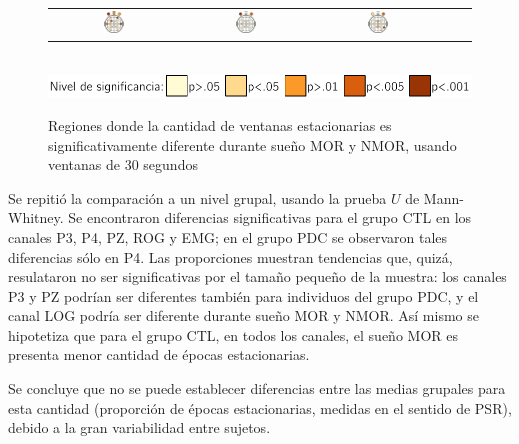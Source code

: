 \begin{figure}
\begin{tabular}{ccccc}
\includegraphics[width=0.17\textwidth]{./img_art_dfa/cabeza_new_RRU_30.pdf} &
\includegraphics[width=0.17\textwidth]{./img_art_dfa/cabeza_new_JGZ_30.pdf} &
\includegraphics[width=0.17\textwidth]{./img_art_dfa/cabeza_new_AEFP_30.pdf} \\
\end{tabular} \\
\includegraphics[scale=.7]{./img_art_dfa/escala.pdf} \\
\caption{Regiones donde la cantidad de ventanas estacionarias es significativamente diferente 
durante sueño MOR y NMOR, usando ventanas de 30 segundos}
\label{cabeza_new}
\end{figure}

Se repitió la comparación a un nivel grupal, usando la prueba $U$ de  Mann-Whitney.
Se encontraron diferencias significativas para el grupo CTL en los canales P3, P4, PZ, 
ROG y EMG; en el grupo PDC se observaron tales diferencias sólo en P4.
%
Las proporciones muestran tendencias que, quizá, resulataron no ser significativas
por el tamaño pequeño de la muestra: los canales P3 y PZ podrían ser diferentes también para
individuos del grupo PDC, y el canal LOG podría ser diferente durante sueño MOR y NMOR.
%
Así mismo se hipotetiza que para el grupo CTL, en todos los canales, el sueño MOR
es presenta menor cantidad de épocas estacionarias.

Se concluye que
no se puede establecer diferencias entre las medias grupales para esta cantidad (proporción de
épocas estacionarias, medidas en el sentido de PSR), debido a la gran variabilidad entre sujetos.


